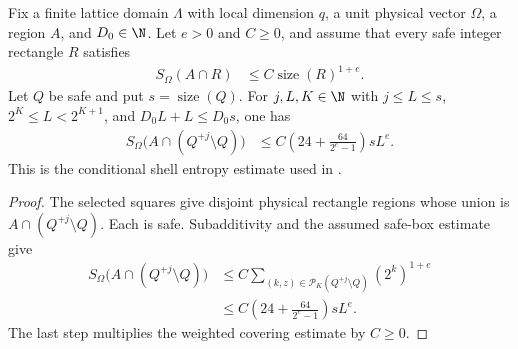 \begin{lemma}
    \label{thm:area_law_rectangle_shell_entropy}
    \leanok
    Fix a finite lattice domain $\Lambda$ with local dimension $q$,
    a unit physical vector $\Omega$, a region $A$, and $D_0\in\N$.
    Let $e>0$ and $C\ge0$, and assume that every safe integer
    rectangle $R$ satisfies
    \begin{align}
        S_\Omega(A\cap R) & \le C\operatorname{size}(R)^{1+e}.
    \end{align}
    Let $Q$ be safe and put $s=\operatorname{size}(Q)$. For $j,L,K\in\N$
    with $j\le L\le s$, $2^K\le L<2^{K+1}$, and $D_0L+L\le D_0s$,
    one has
    \begin{align}
        S_\Omega\bigl(A\cap(Q^{+j}\setminus Q)\bigr)
         & \le C\left(24+\frac{64}{2^e-1}\right)sL^e.
    \end{align}
    This is the conditional shell entropy estimate used in
    \cite[proof of Proposition~9.5, lines~717--729]{OpenAI2026AreaLaw}.
\end{lemma}
\begin{proof}
    \leanok
    The selected squares give disjoint physical rectangle regions
    whose union is $A\cap(Q^{+j}\setminus Q)$. Each is safe.
    Subadditivity and the assumed safe-box estimate give
    \begin{align}
        S_\Omega\bigl(A\cap(Q^{+j}\setminus Q)\bigr)
         & \le C\sum_{(k,z)\in\mathcal P_K(Q^{+j}\setminus Q)}(2^k)^{1+e} \\
         & \le C\left(24+\frac{64}{2^e-1}\right)sL^e.
    \end{align}
    The last step multiplies the weighted covering estimate by $C\ge0$.
\end{proof}

